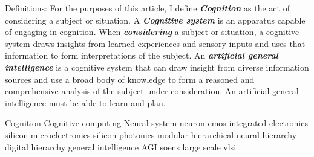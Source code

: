 Definitions: For the purposes of this article, I define \textbf{\textit{Cognition}} as the act of considering a subject or situation. A \textbf{\textit{Cognitive system}} is an apparatus capable of engaging in cognition. When \textbf{\textit{considering}} a subject or situation, a cognitive system draws insights from learned experiences and sensory inputs and uses that information to form interpretations of the subject. An \textbf{\textit{artificial general intelligence}} is a cognitive system that can draw insight from diverse information sources and use a broad body of knowledge to form a reasoned and comprehensive analysis of the subject under consideration. An artificial general intelligence must be able to learn and plan.

\vspace{3em}
Cognition
Cognitive computing
Neural system
neuron
cmos
integrated electronics
silicon microelectronics
silicon photonics
modular 
hierarchical
neural hierarchy
digital hierarchy
general intelligence
AGI
soens
large scale
vlsi
